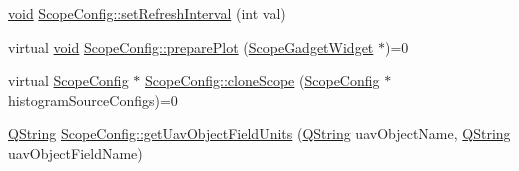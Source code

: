 \begin{DoxyCompactItemize}
\item 
\hyperlink{group___u_a_v_objects_plugin_ga444cf2ff3f0ecbe028adce838d373f5c}{void} \hyperlink{group___scope_plugin_ga9d0e03a1430ff0f766ff51a3daafb2ee}{\-Scope\-Config\-::set\-Refresh\-Interval} (int val)
\item 
virtual \hyperlink{group___u_a_v_objects_plugin_ga444cf2ff3f0ecbe028adce838d373f5c}{void} \hyperlink{group___scope_plugin_gaacd609b338179da5902c1a644a4d9676}{\-Scope\-Config\-::prepare\-Plot} (\hyperlink{class_scope_gadget_widget}{\-Scope\-Gadget\-Widget} $\ast$)=0
\item 
virtual \hyperlink{class_scope_config}{\-Scope\-Config} $\ast$ \hyperlink{group___scope_plugin_ga550248228c701bfd0a35edf08ec94b1a}{\-Scope\-Config\-::clone\-Scope} (\hyperlink{class_scope_config}{\-Scope\-Config} $\ast$histogram\-Source\-Configs)=0
\item 
\hyperlink{group___u_a_v_objects_plugin_gab9d252f49c333c94a72f97ce3105a32d}{\-Q\-String} \hyperlink{group___scope_plugin_gac9be5bd5f2a8394d4d2de1e8b6e9e382}{\-Scope\-Config\-::get\-Uav\-Object\-Field\-Units} (\hyperlink{group___u_a_v_objects_plugin_gab9d252f49c333c94a72f97ce3105a32d}{\-Q\-String} uav\-Object\-Name, \hyperlink{group___u_a_v_objects_plugin_gab9d252f49c333c94a72f97ce3105a32d}{\-Q\-String} uav\-Object\-Field\-Name)
\end{DoxyCompactItemize}
